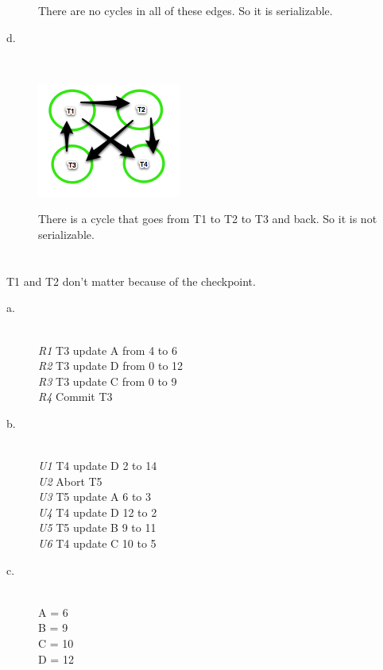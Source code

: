 \documentclass{article}
\begin{document}
\begin{description}
There are no cycles in all of these edges. So it is serializable.
\item[d.]
\ \\
\begin{center}
\includegraphics{1d.png}
\end{center}
There is a cycle that goes from T1 to T2 to T3 and back. So it is not serializable.
\end{description}

\section{}
T1 and T2 don't matter because of the checkpoint.\\
\begin{description}
\item[a.]
\ \\
\emph{R1} T3 update A from 4 to 6\\
\emph{R2} T3 update D from 0 to 12\\
\emph{R3} T3 update C from 0 to 9\\
\emph{R4} Commit T3
\item[b.]
\ \\
\emph{U1} T4 update D 2 to 14\\
\emph{U2} Abort T5\\
\emph{U3} T5 update A 6 to 3\\
\emph{U4} T4 update D 12 to 2\\
\emph{U5} T5 update B 9 to 11\\
\emph{U6} T4 update C 10 to 5
\item[c.]
\ \\
A = 6\\
B = 9\\
C = 10\\
D = 12
\end{description}
\section{}
\end{document}
